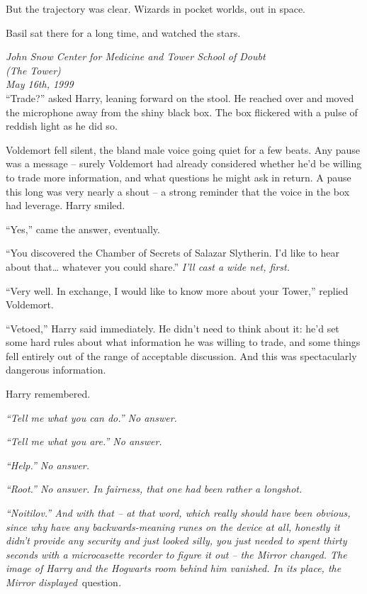 But the trajectory was clear. Wizards in pocket worlds, out in space.

Basil sat there for a long time, and watched the stars.

\mybreak

\emph{John Snow Center for Medicine and Tower School of Doubt\\
(The Tower)}\\
\emph{May 16th, 1999}\\

``Trade?'' asked Harry, leaning forward on the stool. He reached over
and moved the microphone away from the shiny black box. The box
flickered with a pulse of reddish light as he did so.

Voldemort fell silent, the bland male voice going quiet for a few beats.
Any pause was a message -- surely Voldemort had already considered
whether he'd be willing to trade more information, and what questions he
might ask in return. A pause this long was very nearly a shout -- a
strong reminder that the voice in the box had leverage. Harry smiled.

``Yes,'' came the answer, eventually.

``You discovered the Chamber of Secrets of Salazar Slytherin. I'd like
to hear about that\ldots{} whatever you could share.'' \emph{I'll cast a
wide net, first.}

``Very well. In exchange, I would like to know more about your Tower,''
replied Voldemort.

``Vetoed,'' Harry said immediately. He didn't need to think about it:
he'd set some hard rules about what information he was willing to trade,
and some things fell entirely out of the range of acceptable discussion.
And this was spectacularly dangerous information.

Harry remembered.

\emph{``Tell me what you can do.'' No answer.}

\emph{``Tell me what you are.'' No answer.}

\emph{``Help.'' No answer.}

\emph{``Root.'' No answer. In fairness, that one had been rather a
longshot.}

\emph{``Noitilov.'' And with that -- at that word, which really should
have been obvious, since why have any backwards-meaning runes on the
device at all, honestly it didn't provide any security and just looked
silly, you just needed to spent thirty seconds with a microcasette
recorder to figure it out -- the Mirror changed. The image of Harry and
the Hogwarts room behind him vanished. In its place, the Mirror
displayed}~question\emph{.}

